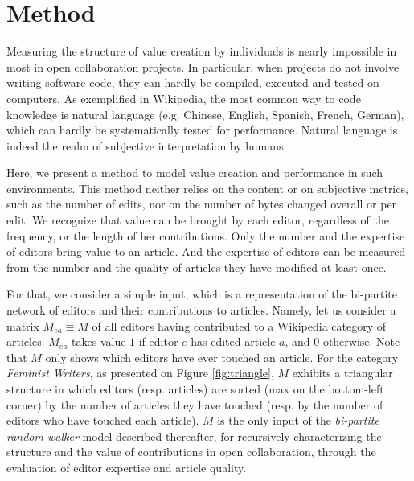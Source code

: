\section{Method}
\label{method}
Measuring the structure of value creation by individuals is nearly impossible in most in open collaboration projects. In particular, when projects do not involve writing software code, they can hardly be compiled, executed and tested on computers. As exemplified in Wikipedia, the most common way to code knowledge is natural language (e.g. Chinese, English, Spanish, French, German), which can hardly be systematically tested for performance. Natural language is indeed the realm of subjective interpretation by humans. 

Here, we present a method to model value creation and performance in such environments. This method neither relies on the content or on subjective metrics, such as the number of edits, nor on the number of bytes changed overall or per edit. We recognize that value can be brought by each editor, regardless of the frequency, or the length of her contributions. Only the number and the expertise of editors bring value to an article.  And the expertise of editors can be measured from the number and the quality of articles they have modified at least once.

For that, we consider a simple input, which is a representation of the bi-partite network of editors and their contributions to articles.  Namely, let us consider a matrix $M_{ea} \equiv M$ of all editors having contributed to a Wikipedia category of articles. $M_{ea}$ takes value $1$ if editor $e$ has edited article $a$, and $0$ otherwise. Note that $M$ only shows which editors have ever touched an article. For the category {\it Feminist Writers}, as presented on Figure \ref{fig:triangle}, $M$ exhibits a triangular structure in which editors (resp. articles) are sorted (max on the bottom-left corner) by the number of articles they have touched (resp. by the number of editors who have touched each article). $M$ is the only input of the {\it bi-partite random walker} model described thereafter, for recursively characterizing the structure and the value of contributions in open collaboration, through the evaluation of editor expertise and article quality.

